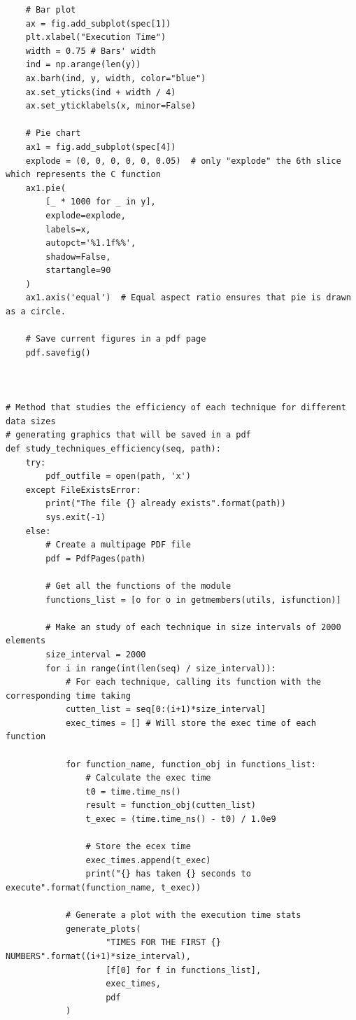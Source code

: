 \documentclass[12 pt]{article}
\begin{document}
\begin{lstlisting}
    # Bar plot
    ax = fig.add_subplot(spec[1])
    plt.xlabel("Execution Time")
    width = 0.75 # Bars' width
    ind = np.arange(len(y))
    ax.barh(ind, y, width, color="blue")
    ax.set_yticks(ind + width / 4)
    ax.set_yticklabels(x, minor=False)

    # Pie chart
    ax1 = fig.add_subplot(spec[4])
    explode = (0, 0, 0, 0, 0, 0.05)  # only "explode" the 6th slice which represents the C function
    ax1.pie(
        [_ * 1000 for _ in y],
        explode=explode,
        labels=x,
        autopct='%1.1f%%',
        shadow=False,
        startangle=90
    )
    ax1.axis('equal')  # Equal aspect ratio ensures that pie is drawn as a circle.

    # Save current figures in a pdf page
    pdf.savefig()



# Method that studies the efficiency of each technique for different data sizes
# generating graphics that will be saved in a pdf
def study_techniques_efficiency(seq, path):
    try:
        pdf_outfile = open(path, 'x')
    except FileExistsError:
        print("The file {} already exists".format(path))
        sys.exit(-1)
    else:
        # Create a multipage PDF file
        pdf = PdfPages(path)

        # Get all the functions of the module
        functions_list = [o for o in getmembers(utils, isfunction)]
        
        # Make an study of each technique in size intervals of 2000 elements
        size_interval = 2000
        for i in range(int(len(seq) / size_interval)):
            # For each technique, calling its function with the corresponding time taking
            cutten_list = seq[0:(i+1)*size_interval]
            exec_times = [] # Will store the exec time of each function 

            for function_name, function_obj in functions_list:
                # Calculate the exec time
                t0 = time.time_ns()
                result = function_obj(cutten_list)
                t_exec = (time.time_ns() - t0) / 1.0e9

                # Store the ecex time
                exec_times.append(t_exec)
                print("{} has taken {} seconds to execute".format(function_name, t_exec))

            # Generate a plot with the execution time stats
            generate_plots(
                    "TIMES FOR THE FIRST {} NUMBERS".format((i+1)*size_interval),
                    [f[0] for f in functions_list],
                    exec_times,
                    pdf
            )
        

\end{lstlisting}
\end{document}
